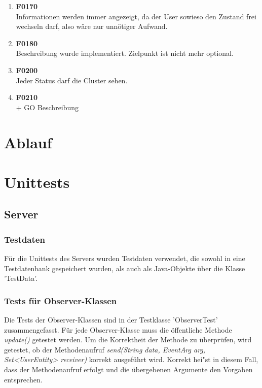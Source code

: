 \documentclass[11pt,a4paper]{scrartcl}
\begin{document}
\begin{enumerate}
\item \textbf{F0170}\\ Informationen werden immer angezeigt, da der User sowieso den Zustand frei wechseln darf, also wäre nur unnötiger Aufwand.

\item \textbf{F0180}\\ Beschreibung wurde implementiert. Zielpunkt ist nicht mehr optional.

\item \textbf{F0200}\\ Jeder Status darf die Cluster sehen.

\item \textbf{F0210}\\ + GO Beschreibung
	
\end{enumerate}

\newpage

\section{Ablauf}

\newpage

\section{Unittests}

\subsection{Server}

\subsubsection{Testdaten}\label{Testdaten}
Für die Unittests des Servers wurden Testdaten verwendet, die sowohl in eine Testdatenbank gespeichert wurden, als auch als Java-Objekte über die Klasse 'TestData'.

\subsubsection{Tests für Observer-Klassen}
Die Tests der Observer-Klassen sind in der Testklasse 'ObserverTest' zusammengefasst. Für jede Observer-Klasse muss die öffentliche Methode \textit{update()} getestet werden.
Um die Korrektheit der Methode zu überprüfen, wird getestet, ob der Methodenaufruf \textit{send(String data, EventArg arg, Set<UserEntity> receiver)} korrekt ausgeführt wird. Korrekt hei"st in diesem Fall, dass der Methodenaufruf erfolgt und die übergebenen Argumente den Vorgaben entsprechen.
\end{document}
